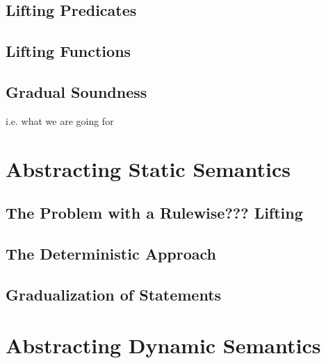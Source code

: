     \subsection{Lifting Predicates}
    \label{ssec:lifting-predicates}
    
    
    \subsection{Lifting Functions}
    \label{ssec:lifting-functions}
    
    
    \subsection{Gradual Soundness}
    i.e. what we are going for

\section{Abstracting Static Semantics}
\label{sec:abstracting-static-semantics}


    \subsection{The Problem with a Rulewise??? Lifting}
    \label{ssec:the-problem-with}
    
    
    \subsection{The Deterministic Approach}
    \label{ssec:the-deterministic-approach}
    
    
    \subsection{Gradualization of Statements}

\section{Abstracting Dynamic Semantics}
\label{sec:abstracting-dynamic-semantics}






